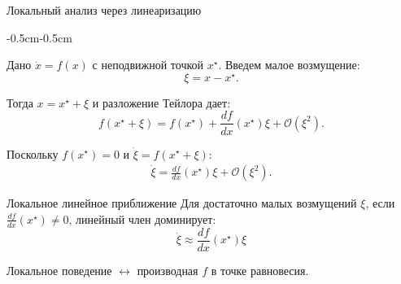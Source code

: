 \documentclass{beamer}
\begin{document}
	
	\begin{frame}{Локальный анализ через линеаризацию}
		\begin{flushleft}
			\begin{adjustwidth}{-0.5cm}{-0.5cm}
				
				Дано \(\dot{x}=f(x)\) с неподвижной точкой \(x^\star\). Введем малое возмущение:
				\[
				\xi = x-x^\star.
				\]
				
				Тогда \(x=x^\star+\xi\) и разложение Тейлора дает:
				\[
				f(x^\star+\xi)
				=
				f(x^\star)
				+
				\frac{df}{dx}(x^\star)\xi
				+
				\mathcal{O}(\xi^2).
				\]
				
				Поскольку \(f(x^\star)=0\) и \(\dot{\xi} = f(x^\star+\xi)\):
				\begin{align*}
					\dot{\xi}
					=
					\frac{df}{dx}(x^\star)\xi
					+
					\mathcal{O}(\xi^2).
				\end{align*}
				\vspace{-0.9em}
				\begin{block}{Локальное линейное приближение}
					Для достаточно малых возмущений \(\xi\), если \(\frac{df}{dx}(x^\star)\neq 0\), линейный член доминирует:
					\[
					\dot{\xi}
					\approx
					\frac{df}{dx}(x^\star)\xi
					\]
				\end{block}
				
				Локальное поведение \(\leftrightarrow\) производная \(f\) в точке равновесия.
				
			\end{adjustwidth}
		\end{flushleft}
	\end{frame}
	
	
	
\end{document}
